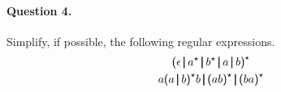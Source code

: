 \paragraph{Question 4.} Simplify, if possible, the following regular
expressions.
\begin{gather*}
  \textsf{(} \epsilon \, \pmb{\lvert}{} \, a^{\star}{} \, \pmb{\lvert}{} \,
  b^{\star}{} \, \pmb{\lvert}{} \, a \, \pmb{\lvert}{} \, b \textsf{)}^{\star}\\
  a \textsf{(} a \, \pmb{\lvert}{} \, b \textsf{)}^{\star}{} b
  \, \pmb{\lvert}{} \, \textsf{(} a b \textsf{)}^{\star}{}
  \, \pmb{\lvert}{} \, \textsf{(} b a \textsf{)}^{\star}
\end{gather*}
